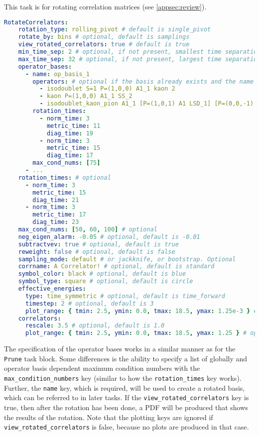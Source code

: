 \documentclass[12pt,letterpaper,notitlepage]{article}
\newcommand{\key}[1]{\textcolor{Emerald}{\texttt{\small{#1}}}}
\begin{document}
This task is for rotating correlation matrices (see \autoref{appsec:review}).
\begin{lstlisting}[language=yaml]
  RotateCorrelators:
    rotation_type: rolling_pivot # default is single_pivot
    rotate_by: bins # optional, default is samplings
    view_rotated_correlators: true # default is true
    min_time_sep: 2 # optional, if not present, smallest time separation used
    max_time_sep: 32 # optional, if not present, largest time separation used
    operator_bases:
      - name: op_basis_1
        operators: # optional if the basis already exists and the name is given
          - isodoublet S=1 P=(1,0,0) A1_1 kaon 2
          - kaon P=(1,0,0) A1_1 SS_2
          - isodoublet_kaon_pion A1_1 [P=(1,0,1) A1 LSD_1] [P=(0,0,-1) A2 TSD_2]
        rotation_times:
          - norm_time: 3
            metric_time: 11
            diag_time: 19
          - norm_time: 3
            metric_time: 15
            diag_time: 17
        max_cond_nums: [75]
      - ... 
    rotation_times: # optional
      - norm_time: 3
        metric_time: 15
        diag_time: 21
      - norm_time: 3
        metric_time: 17
        diag_time: 23
    max_cond_nums: [50, 60, 100] # optional
    neg_eigen_alarm: -0.05 # optional, default is -0.01
    subtractvev: true # optional, default is true
    reweight: false # optional, default is false
    sampling_mode: default # or jackknife, or bootstrap. Optional
    corrname: A Correlator! # optional, default is standard
    symbol_color: black # optional, default is blue
    symbol_type: square # optional, default is circle
    effective_energies:
      type: time_symmetric # optional, default is time_forward
      timestep: 2 # optional, default is 3
      plot_range: { tmin: 2.5, ymin: 0.0, tmax: 18.5, ymax: 1.25e-3 } # optional
    correlators:
      rescale: 3.5 # optional, default is 1.0
      plot_range: { tmin: 2.5, ymin: 0.0, tmax: 18.5, ymax: 1.25 } # optional
\end{lstlisting}
The specification of the operator bases works in a similar manner as for the \key{Prune} task block.
Some differences is the ability to specify a list of globally and operator basis dependent
maximum condition numbers with the \key{max\_condition\_numbers} key (similar to how the \key{rotation\_times} key works).
Further, the \key{name} key, which is required, will be used to create a rotated basis, which can be referred to in later tasks.
If the \key{view\_rotated\_correlators} key is true, then after the rotation has been done, a \textsc{PDF} will be produced that shows the results of the rotation.
Note that the plotting keys are ignored if \key{view\_rotated\_correlators} is false, because no plots are produced in that case.
\end{document}
